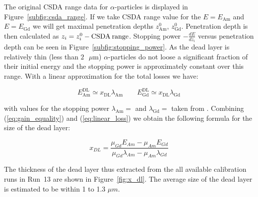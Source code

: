 \documentclass[a4paper,12pt]{article}
\begin{document}

The original CSDA range data for $\alpha$-particles is displayed in
Figure~\ref{subfig:csda_range}. If we take CSDA range value for the
$E=E_{\text{Am}}$ and $E=E_{\text{Gd}}$ we will get maximal penetration depths
$z^0_{\text{Am}}$, $z^0_{\text{Gd}}$.  Penetration depth is then calculated as
$z_i = z^0_i - \text{CSDA\:range}$.  Stopping power $-\frac{dE}{dz_i}$ versus
penetration depth can be seen in Figure~\ref{subfig:stopping_power}. As the
dead layer is relatively thin (less than $2\text{ }\mu\text{m}$)
$\alpha$-particles do not loose a significant fraction of their initial energy
and the stopping power is approximately constant over this range. With a linear
approximation for the total losses we have:

\begin{equation}
E^\text{DL}_\text{Am} \simeq x_\text{DL} \lambda_\text{Am} \qquad
E^\text{DL}_\text{Gd} \simeq x_\text{DL} \lambda_\text{Gd}
\label{eq:linear_loss}
\end{equation}

\noindent
with values for the stopping power $\lambda_\text{Am} = $ and $\lambda_\text{Gd}
= $ taken from \cite{astar_database}. Combining (\ref{eq:gain_equality}) and
(\ref{eq:linear_loss}) we obtain the following formula for the size of the dead
layer:

\begin{equation}
x_{DL} = \frac{\mu_{Gd} E_{Am} - \mu_{Am} E_{Gd}}{\mu_{Gd}\lambda_{Am} - \mu_{Am}\lambda_{Gd}}
\label{eq:x_dl}
\end{equation}

The thickness of the dead layer thus extracted from the all available
calibration runs in Run~13 are shown in Figure~\ref{fig:x_dl}. The average size
of the dead layer is estimated to be within 1 to 1.3 $\mu m$.
\end{document}
